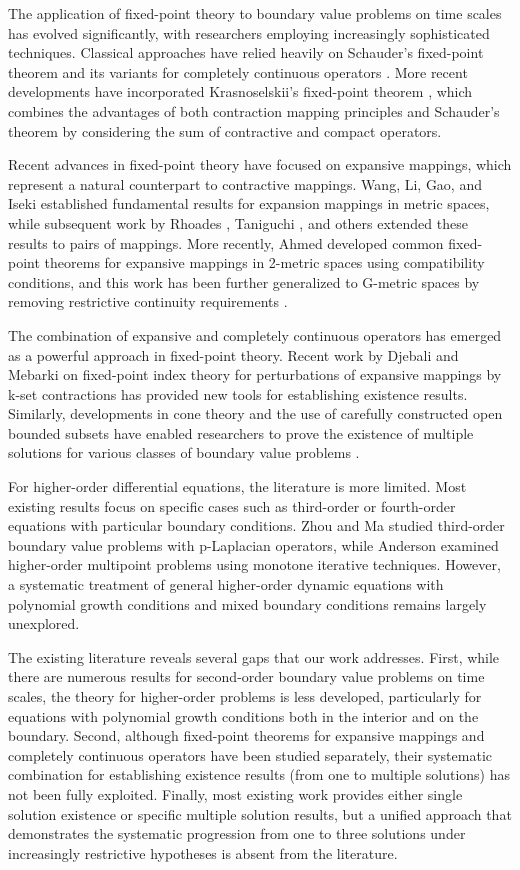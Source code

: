 \documentclass[reqno, 12pt]{amsart}
\numberwithin{equation}{section}
\begin{document}
The application of fixed-point theory to boundary value problems on time scales has evolved significantly, with researchers employing increasingly sophisticated techniques. Classical approaches have relied heavily on Schauder's fixed-point theorem and its variants for completely continuous operators \cite{S}. More recent developments have incorporated Krasnoselskii's fixed-point theorem \cite{K}, which combines the advantages of both contraction mapping principles and Schauder's theorem by considering the sum of contractive and compact operators.

Recent advances in fixed-point theory have focused on expansive mappings, which represent a natural counterpart to contractive mappings. Wang, Li, Gao, and Iseki \cite{WLGI} established fundamental results for expansion mappings in metric spaces, while subsequent work by Rhoades \cite{R}, Taniguchi \cite{T}, and others extended these results to pairs of mappings. More recently, Ahmed \cite{AH} developed common fixed-point theorems for expansive mappings in 2-metric spaces using compatibility conditions, and this work has been further generalized to G-metric spaces by removing restrictive continuity requirements \cite{SPB}.

The combination of expansive and completely continuous operators has emerged as a powerful approach in fixed-point theory. Recent work by Djebali and Mebarki \cite{3} on fixed-point index theory for perturbations of expansive mappings by k-set contractions has provided new tools for establishing existence results. Similarly, developments in cone theory and the use of carefully constructed open bounded subsets have enabled researchers to prove the existence of multiple solutions for various classes of boundary value problems \cite{LP,GP}.

For higher-order differential equations, the literature is more limited. Most existing results focus on specific cases such as third-order or fourth-order equations with particular boundary conditions. Zhou and Ma \cite{ZM} studied third-order boundary value problems with p-Laplacian operators, while Anderson \cite{A3} examined higher-order multipoint problems using monotone iterative techniques. However, a systematic treatment of general higher-order dynamic equations with polynomial growth conditions and mixed boundary conditions remains largely unexplored.

The existing literature reveals several gaps that our work addresses. First, while there are numerous results for second-order boundary value problems on time scales, the theory for higher-order problems is less developed, particularly for equations with polynomial growth conditions both in the interior and on the boundary. Second, although fixed-point theorems for expansive mappings and completely continuous operators have been studied separately, their systematic combination for establishing existence results (from one to multiple solutions) has not been fully exploited. Finally, most existing work provides either single solution existence or specific multiple solution results, but a unified approach that demonstrates the systematic progression from one to three solutions under increasingly restrictive hypotheses is absent from the literature.
\end{document}

